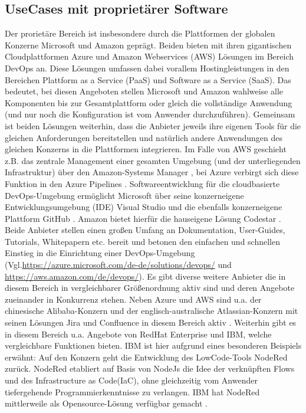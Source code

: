 \subsection{UseCases mit proprietärer Software}
\label{UseCases mit proprietärer Software}
Der prorietäre Bereich ist insbesondere durch die Plattformen der globalen Konzerne Microsoft und Amazon geprägt. Beiden bieten mit ihren gigantischen Cloudplattformen Azure und Amazon Webservices (\acrshort{AWS}) Lösungen im Bereich \gls{DevOps} an. Diese Lösungen umfassen dabei vorallem Hostingleistungen in den Bereichen Plattform as a Service (\acrshort{PaaS}) und Software as a Service (\acrshort{SaaS}). Das bedeutet, bei diesen Angeboten stellen Microsoft und Amazon wahlweise alle Komponenten bis zur Gesamtplattform oder gleich die vollständige Anwendung (und nur noch die Konfiguration ist vom Anwender durchzuführen).
Gemeinsam ist beiden Lösungen weiterhin, dass die Anbieter jeweils ihre eigenen Tools für die gleichen Anforderungen bereitstellen und natürlich andere Anwendungen des gleichen Konzerns in die Plattformen integrieren.
Im Falle von \acrshort{AWS} geschieht z.B. das zentrale Management einer gesamten Umgebung (und der unterliegenden Infrastruktur) über den Amazon-Systems Manager \cite{aws_systems_manager}, bei Azure verbirgt sich diese Funktion in den Azure Pipelines \cite{azure_devops_loesungen}.
Softwareentwicklung für die cloudbasierte \gls{DevOps}-Umgebung ermöglicht Microsoft über seine konzerneigene Entwicklungsumgebung (\acrshort{IDE}) Visual Studio und die ebenfalls konzerneigene Plattform  GitHub \cite{azure_devops_loesungen}. Amazon bietet hierfür die hauseigene Lösung Codestar \cite{aws_codestar}.
Beide Anbieter stellen einen großen Umfang an Dokumentation, User-Guides, Tutorials, Whitepapern etc. bereit und betonen den einfachen und schnellen Einstieg in die Einrichtung einer \gls{DevOps}-Umgebung (Vgl.\url{https://azure.microsoft.com/de-de/solutions/devops/} und \url{https://aws.amazon.com/de/devops/}).\newline
Es gibt diverse weitere Anbieter die in diesem Bereich in vergleichbarer Größenordnung aktiv sind und deren Angebote zueinander in Konkurrenz stehen. Neben Azure und \acrshort{AWS} sind u.a. der chinesische Alibaba-Konzern \cite{alibaba_devops} und der englisch-australische Atlassian-Konzern mit seinen Lösungen Jira und Confluence in diesem Bereich aktiv \cite{atlassian_jira_nodate}. 
Weiterhin gibt es in diesem Bereich u.a. Angebote von RedHat Enterprise \cite{redhat_openshift_2017} und IBM, welche vergleichbare Funktionen bieten. IBM ist hier aufgrund eines besonderen Beispiels erwähnt: Auf den Konzern geht die Entwicklung des \gls{LowCode}-Tools NodeRed zurück. NodeRed etabliert auf Basis von NodeJs die Idee der verknüpften Flows und des \glqq{}Infrastructure as Code\grqq (\acrshort{IaC}), ohne gleichzeitig vom Anwender tiefergehende Programmierkenntnisse zu verlangen. IBM hat NodeRed mittlerweile als Opensource-Lösung verfügbar gemacht \cite{nodered_about}.
